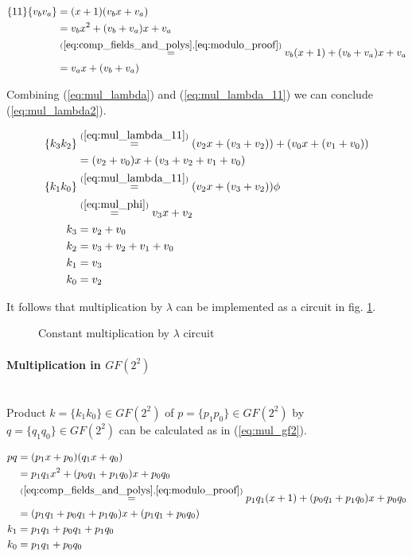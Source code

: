 \begin{equation}
\label{eq:mul_lambda_11}
\begin{aligned}
\{11\}\{v_bv_a\} &= (x + 1)(v_bx + v_a)\\
&= v_bx^2 + (v_b + v_a)x + v_a \\
&\stackrel{(\ref{eq:comp_fields_and_polys}, \ref{eq:modulo_proof})}{=}
v_b(x + 1) + (v_b + v_a)x + v_a \\
&= v_ax + (v_b + v_a)
\end{aligned}
\end{equation}

Combining (\ref{eq:mul_lambda}) and (\ref{eq:mul_lambda_11}) we can conclude (\ref{eq:mul_lambda2}).

\begin{equation}
\label{eq:mul_lambda2}
\begin{aligned}
\{k_3k_2\}
&\stackrel{(\ref{eq:mul_lambda_11})}{=}
(v_2x + (v_3 + v_2)) + (v_0x + (v_1 + v_0)) \\
&= (v_2 + v_0)x + (v_3 + v_2 + v_1 + v_0)\\
\{k_1k_0\}
&\stackrel{(\ref{eq:mul_lambda_11})}{=}
(v_2x + (v_3 + v_2))\phi \\
&\stackrel{(\ref{eq:mul_phi})}{=}
v_3x + v_2\\
k_3 &= v_2 + v_0\\
k_2 &= v_3 + v_2 + v_1 + v_0\\
k_1 &= v_3\\
k_0 &= v_2
\end{aligned}
\end{equation}


It follows that multiplication by $\lambda$ can be implemented as a circuit in fig. \ref{fig:lambda_mul}.

\begin{figure}[!h]
\label{fig:lambda_mul}
\missingfigure[figwidth=6cm]{}
\caption{Constant multiplication by $\lambda$ circuit}
\end{figure}


\paragraph{Multiplication in $GF(2^2)$}\mbox{}\\
Product $k = \{k_1k_0\} \in GF(2^2)$ of $p = \{p_1p_0\} \in GF(2^2)$ by $q = \{q_1q_0\} \in GF(2^2)$ can be calculated as in (\ref{eq:mul_gf2}).

\begin{equation}
\label{eq:mul_gf2}
\begin{aligned}
pq &= (p_1x + p_0)(q_1x + q_0)\\
&= p_1q_1x^2 + (p_0q_1 + p_1q_0)x + p_0q_0\\
&\stackrel{(\ref{eq:comp_fields_and_polys}, \ref{eq:modulo_proof})}{=}
p_1q_1(x + 1) + (p_0q_1 + p_1q_0)x + p_0q_0\\
&=(p_1q_1 + p_0q_1 + p_1q_0)x + (p_1q_1 + p_0q_0)\\
k_1 &= p_1q_1 + p_0q_1 + p_1q_0\\
k_0 &= p_1q_1 + p_0q_0
\end{aligned}
\end{equation}

